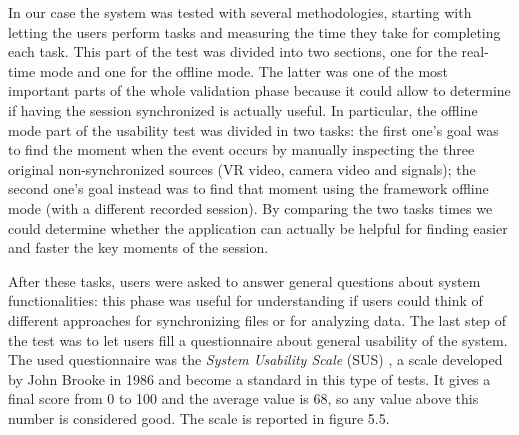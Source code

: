 \documentclass[binding=0.6cm,LaM]{sapthesis}
\begin{document}
In our case the system was tested with several methodologies, starting with letting the users perform tasks and measuring the time they take for completing each task. This part of the test was divided into two sections, one for the real-time mode and one for the offline mode. The latter was one of the most important parts of the whole validation phase because it could allow to determine if having the session synchronized is actually useful. In particular, the offline mode part of the usability test was divided in two tasks: the first one's goal was to find the moment when the event occurs by manually inspecting the three original non-synchronized sources (VR video, camera video and signals); the second one's goal instead was to find that moment using the framework offline mode (with a different recorded session). 
By comparing the two tasks times we could determine whether the application can actually be helpful for finding easier and faster the key moments of the session.

After these tasks, users were asked to answer general questions about system functionalities: this phase was useful for understanding if users could think of different approaches for synchronizing files or for analyzing data.
The last step of the test was to let users fill a questionnaire about general usability of the system. The used questionnaire was the \textit{System Usability Scale} (SUS) \cite{brooke1996sus}, a scale developed by John Brooke in 1986 and become a standard in this type of tests. It gives a final score from 0 to 100 and the average value is 68, so any value above this number is considered good. The scale is reported in figure 5.5.
\end{document}
